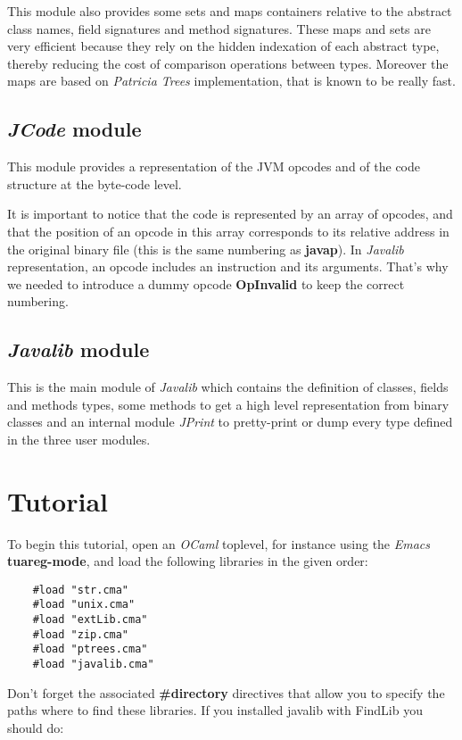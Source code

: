 \documentclass{article}
\begin{document}
This module also provides some sets and maps containers relative to
the abstract class names, field signatures and method signatures.
These maps and sets are very efficient because they rely on the
hidden indexation of each abstract type, thereby reducing the cost
of comparison operations between types. Moreover the maps are based
on \emph{Patricia Trees} implementation, that is known to be really
fast.

\subsection{\emph{JCode} module}

This module provides a representation of the JVM opcodes and of the
code structure at the byte-code level.

It is important to notice that the code is represented by an array
of opcodes, and that the position of an opcode in this array
corresponds to its relative address in the original binary file
(this is the same numbering as \textbf{javap}). In \emph{Javalib}
representation, an opcode includes an instruction and its
arguments. That's why we needed to introduce a dummy opcode
\textbf{OpInvalid} to keep the correct numbering.

\subsection{\emph{Javalib} module}

This is the main module of \emph{Javalib} which contains the
definition of classes, fields and methods types, some methods to
get a high level representation from binary classes and an internal
module \emph{JPrint} to pretty-print or dump every type defined in
the three user modules.

\section{Tutorial}

To begin this tutorial, open an \emph{OCaml} toplevel, for instance
using the \emph{Emacs} \textbf{tuareg-mode}, and load the following
libraries in the given order:

\begin{verbatim}
    #load "str.cma"
    #load "unix.cma"
    #load "extLib.cma"
    #load "zip.cma"
    #load "ptrees.cma"
    #load "javalib.cma"
\end{verbatim}
Don't forget the associated \textbf{\#directory} directives that
allow you to specify the paths where to find these libraries. If
you installed javalib with FindLib you should do:
\end{document}
